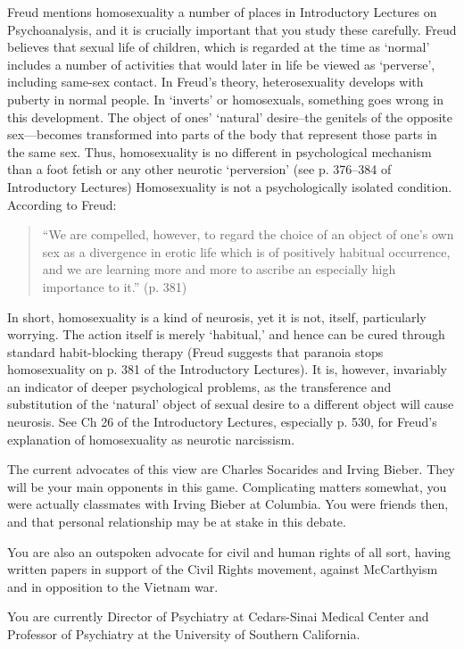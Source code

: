 \begin{refsection}
Freud mentions homosexuality a number of places in Introductory Lectures on Psychoanalysis, and it is crucially important that you study these carefully. Freud believes that sexual life of children, which is regarded at the time as `normal' includes a number of activities that would later in life be viewed as `perverse', including same-sex contact. In Freud's theory, heterosexuality develops with puberty in normal people. In `inverts' or homosexuals, something goes wrong in this development. The object of ones' `natural' desire--the genitels of the opposite sex---becomes transformed into parts of the body that represent those parts in the same sex. Thus, homosexuality is no different in psychological mechanism than a foot fetish or any other neurotic `perversion' (see p. 376--384 of Introductory Lectures) Homosexuality is not a psychologically isolated condition. According to Freud:

\begin{quote}

``We are compelled, however, to regard the choice of an object of one's own sex as a divergence in erotic life which is of positively habitual occurrence, and we are learning more and more to ascribe an especially high importance to it.'' (p. 381)
\end{quote}

In short, homosexuality is a kind of neurosis, yet it is not, itself, particularly worrying. The action itself is merely `habitual,' and hence can be cured through standard habit-blocking therapy (Freud suggests that paranoia stops homosexuality on p. 381 of the Introductory Lectures). It is, however, invariably an indicator of deeper psychological problems, as the transference and substitution of the `natural' object of sexual desire to a different object will cause neurosis. See Ch 26 of the Introductory Lectures, especially p. 530, for Freud's explanation of homosexuality as neurotic narcissism.

The current advocates of this view are Charles Socarides and Irving Bieber. They will be your main opponents in this game. Complicating matters somewhat, you were actually classmates with Irving Bieber at Columbia. You were friends then, and that personal relationship may be at stake in this debate.

You are also an outspoken advocate for civil and human rights of all sort, having written papers in support of the Civil Rights movement, against McCarthyism and in opposition to the Vietnam war.

You are currently Director of Psychiatry at Cedars-Sinai Medical Center and Professor of Psychiatry at the University of Southern California.


\end{refsection}
